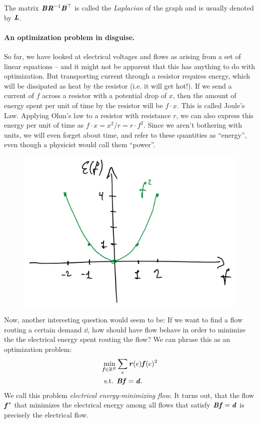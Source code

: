The matrix $\boldsymbol{\mathit{B}} \boldsymbol{\mathit{R}}^{-1}\boldsymbol{\mathit{B}}^{\top}$ is called the \emph{Laplacian} of
the graph and is usually denoted by $\boldsymbol{\mathit{L}}$.

\paragraph{An optimization problem in disguise.}
So far, we have looked at electrical voltages and flows as arising
from a set of linear equations -- and it might not be apparent that
this has anything to do with optimization.
But transporting current through a resistor requires energy, which will be
dissipated as heat by the resistor (i.e. it will get hot!).
If we send a current of $f$ across a resistor with a potential drop of
$x$, then the amount of energy spent per unit of time by the resistor will be
$f \cdot x$. This is called Joule's Law.
Applying Ohm's law to a resistor with resistance $r$,
we can also express this energy per unit of time
as $f \cdot x = x^2 / r = r \cdot f ^2$.
Since we aren't bothering with units, we will even forget about time,
and refer to these quantities as ``energy'', even though a physicist
would call them ``power''.

\begin{figure}[H]
  \centering
  \includegraphics[width=0.6\linewidth]{fig/lecture1_flow-vs-energy.png}
  \label{fig:flow-vs-energy}
\end{figure}

Now, another interesting question would seem to be: If we want to find
a flow routing a certain demand $\dd$, how should have flow behave in
order to minimize the the electrical energy spent routing the flow?
We can phrase this as an optimization problem:
\begin{align*}
  \min_{\boldsymbol{\mathit{f}} \in \mathbb{R}^E} & \sum_e \boldsymbol{\mathit{r}}(e) \boldsymbol{\mathit{f}}(e)^2
  \\
  \textrm{s.t. } & \boldsymbol{\mathit{B}} \boldsymbol{\mathit{f}} = \boldsymbol{\mathit{d}} .
\end{align*}
We call this problem \emph{electrical energy-minimizing flow}.
It turns out, that the flow $\boldsymbol{\mathit{f}}^*$ that minimizes the electrical
energy among all flows that satisfy $\boldsymbol{\mathit{B}} \boldsymbol{\mathit{f}} = \boldsymbol{\mathit{d}}$ is precisely the
electrical flow.

